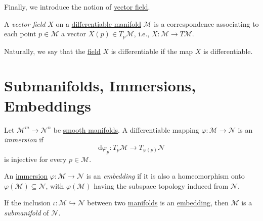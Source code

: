 Finally, we introduce the notion of \hyperref[def:vector-field]{vector field}.

\begin{definition}\label{def:vector-field}
	A \emph{vector field} \(X\) on a \hyperref[def:smooth-manifold]{differentiable manifold} \(\mathcal{M} \) is a correspondence associating to each point \(p\in \mathcal{M} \) a vector \(X(p)\in T_p \mathcal{M} \), i.e., \(X\colon \mathcal{M} \to T\mathcal{M} \).
\end{definition}

\begin{remark}
	Naturally, we say that the \hyperref[def:vector-field]{field} \(X\) is differentiable if the map \(X\) is differentiable.
\end{remark}

\section{Submanifolds, Immersions, Embeddings}

\begin{definition}[Immersion]\label{def:immersion}
	Let \(\mathcal{M} ^m \to \mathcal{N} ^n \) be \hyperref[def:smooth-manifold]{smooth manifolds}. A differentiable mapping \(\varphi \colon \mathcal{M} \to  \mathcal{N} \) is an \emph{immersion} if
	\[
		\mathrm{d} \varphi _p \colon T_p \mathcal{M} \to  T_{\varphi (p)} \mathcal{N}
	\]
	is injective for every \(p\in \mathcal{M} \).
\end{definition}

\begin{definition}[Embedding]\label{def:embedding}
	An \hyperref[def:immersion]{immersion} \(\varphi \colon \mathcal{M} \to \mathcal{N} \) is an \emph{embedding} if it is also a homeomorphism onto \(\varphi (\mathcal{M} )\subseteq \mathcal{N} \), with \(\varphi (\mathcal{M} )\) having the subspace topology induced from \(\mathcal{N} \).
\end{definition}

\begin{definition}[Submanifold]\label{def:submanifold}
	If the inclusion \(\iota \colon \mathcal{M} \hookrightarrow \mathcal{N} \) between two \hyperref[def:smooth-manifold]{manifolds} is an \hyperref[def:embedding]{embedding}, then \(\mathcal{M} \) is a \emph{submanifold} of \(\mathcal{N} \).
\end{definition}

